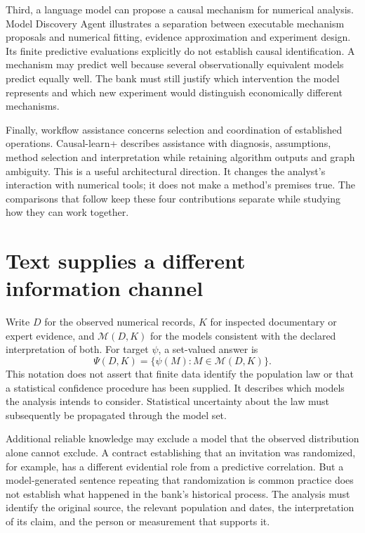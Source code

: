Third, a language model can propose a causal mechanism for numerical analysis.
Model Discovery Agent illustrates a separation between executable mechanism
proposals and numerical fitting, evidence approximation and experiment design.
Its finite predictive evaluations explicitly do not establish causal
identification. \cite{v12_la_2608_09696} A mechanism may predict well because
several observationally equivalent models predict equally well. The bank must
still justify which intervention the model represents and which new experiment
would distinguish economically different mechanisms.

Finally, workflow assistance concerns selection and coordination of established
operations. Causal-learn+ describes assistance with diagnosis, assumptions,
method selection and interpretation while retaining algorithm outputs and
graph ambiguity. \cite{v12_la_2606_23608} This is a useful architectural direction.
It changes the analyst's interaction with numerical tools; it does not make a
method's premises true. The comparisons that follow keep these four contributions
separate while studying how they can work together.

\section{Text supplies a different information channel}

Write $D$ for the observed numerical records, $K$ for inspected documentary or
expert evidence, and $\mathcal M(D,K)$ for the models consistent with the
declared interpretation of both. For target $\psi$, a set-valued answer is
\[
 \Psi(D,K)=\{\psi(M):M\in\mathcal M(D,K)\}.
\]
This notation does not assert that finite data identify the population law or
that a statistical confidence procedure has been supplied. It describes which
models the analysis intends to consider. Statistical uncertainty about the law
must subsequently be propagated through the model set.

Additional reliable knowledge may exclude a model that the observed distribution
alone cannot exclude. A contract establishing that an invitation was randomized,
for example, has a different evidential role from a predictive correlation.
But a model-generated sentence repeating that randomization is common practice
does not establish what happened in the bank's historical process. The analysis
must identify the original source, the relevant population and dates, the
interpretation of its claim, and the person or measurement that supports it.

